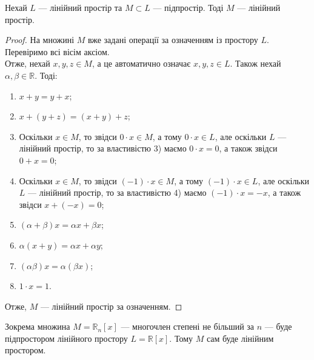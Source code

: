 \documentclass{math_library}
\begin{document}
	\begin{proposition}
	Нехай $L$ --- лінійний простір та $M \subset L$ --- підпростір. Тоді $M$ --- лінійний простір.
	\end{proposition}
	
	\begin{proof}
	На множині $M$ вже задані операції за означенням із простору $L$. Перевіримо всі вісім аксіом. \\
	Отже, нехай $x,y,z \in M$, а це автоматично означає $x,y,z \in L$. Також нехай $\alpha,\beta \in \mathbb{R}$. Тоді:
	\begin{enumerate}[wide = 0pt, nosep, label={\arabic*)}]
	\item $x+y=y+x$;
	\item $x+(y+z)=(x+y)+z$;
	\item Оскільки $x \in M$, то звідси $0\cdot x \in M$, а тому $0 \cdot x \in L$, але оскільки $L$ --- лінійний простір, то за властивістю 3) маємо $0 \cdot x = 0$, а також звідси $0 + x = 0$;
	\item Оскільки $x \in M$, то звідси $(-1) \cdot x \in M$, а тому $(-1) \cdot x \in L$, але оскільки $L$ --- лінійний простір, то за властивістю 4) маємо $(-1) \cdot x = -x$, а також звідси $x + (-x) = 0$;
	\item $(\alpha + \beta)x = \alpha x + \beta x$;
	\item $\alpha (x+y)= \alpha x + \alpha y$;
	\item $(\alpha \beta) x = \alpha (\beta x)$;
	\item $1 \cdot x = 1$.
	\end{enumerate}
	Отже, $M$ --- лінійний простір за означенням.
	\end{proof}

	\begin{example}	
	Зокрема множина $M = \mathbb{R}_n[x]$ --- многочлен степені не більший за $n$ --- буде підпростором лінійного простору $L = \mathbb{R}[x]$. Тому $M$ сам буде лінійним простором.
	\end{example}
	
\end{document}
